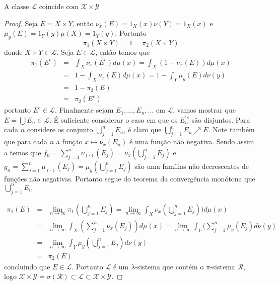 \begin{proposicao}
A classe $\mathscr{L}$ coincide com $\mathscr{X}\times \mathscr{Y}$
\end{proposicao}


\begin{proof}
Seja $E=X\times Y$, então $\nu_x(E)=1_X(x)\nu(Y)=1_X(x)$ e $\mu_y(E)=1_Y(y)\mu(X)=1_Y(y)$. Portanto 
$$
\pi_1(X\times Y)=1=\pi_2(X\times Y)
$$
donde $X\times Y\in \mathscr{L}$. Seja $E\in \mathscr{L}$, então temos que
$$
\begin{array}{rcl}
\pi_1(E^c)&=&\displaystyle\int_X \nu_x(E^c)d\mu(x)
=
\int_X (1-\nu_x(E))d\mu(x)
\\[5mm]
&
=
&
\displaystyle 1-\int_X\nu_x(E) d\mu (x)
=
1-\int_Y \mu_y(E)d\nu(y)
\\[5mm]
&
=
&
1-\pi_2(E)
\\[5mm]
&
=
&
\pi_2(E^c)
\end{array}
$$
portanto $E^c\in \mathscr{L}$.  Finalmente sejam $E_1, \ldots, E_n, \ldots $ em $\mathscr{L}$, vamos mostrar que $E=\bigcup E_n\in \mathscr{L}.$ É suficiente considerar o caso em que os $E_n^{'s}$ são disjuntos. Para cada $n$ considere os conjunto $\bigcup_{j=1}^nE_n$, é claro que   $\bigcup_{j=1}^nE_n\nearrow E.$ Note também que para cada $n$ a função $x\mapsto \nu_x(E_n)$ é uma função não negativa. Sendo assim a temos que  $f_n=\sum_{j=1}^n\nu_{(\cdot)}(E_j)=\nu_x(\bigcup_{j=1}^{n}E_j)$ e $g_n=\sum_{j=1}^n\mu_{(\cdot)}(E_j)=\mu_y(\bigcup_{j=1}^{n}E_j)$ são  uma famílias não decrescentes de funções não negativas. Portanto segue do teorema da convergência monótona
que  $\bigcup_{j=1}^nE_n$

$$
\begin{array}{rcl}
\pi_1(E)&=&\displaystyle\lim_{n\to \infty}\pi_1(\bigcup_{j=1}^{n}E_j)
=
\lim_{n\to \infty}\int_X \nu_x(\bigcup_{j=1}^{n}E_j))d\mu(x)
\\[5mm]
&
=
&
\displaystyle \lim_{n\to \infty}\int_X (\sum_{j=1}^n\nu_x(E_j)) d\mu(x)
=
\lim_{n\to \infty}\int_Y(\sum_{j=1}^{n}\mu_y(E_j)d\nu(y)
\\[5mm]
&
=
&
\displaystyle\lim_{n\to \infty} \int_Y \mu_y(\bigcup_{j=1}^{n}E_j)d\nu(y)
\\
&=&
\pi_2(E)
\end{array}
$$
concluindo que $E\in \mathscr{L}$. Portanto $\mathscr{L}$ é um $\lambda$-sistema 
que contém o $\pi$-sistema $\mathscr{R}$, logo $\mathscr{X}\times \mathscr{Y}=\sigma(\mathscr{R})\subset \mathscr{L}\subset \mathscr{X}\times \mathscr{Y}.$

\end{proof}


